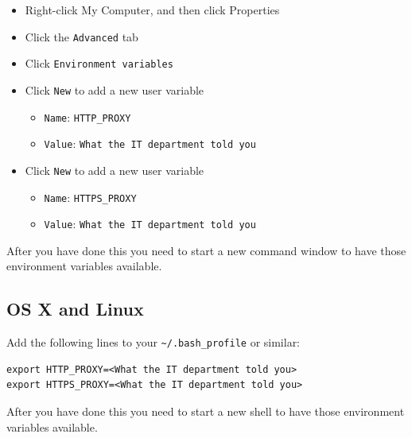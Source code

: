\documentclass[a4paper,12pt]{report}
\begin{document}
\begin{itemize}
    \item Right-click My Computer, and then click Properties
    \item Click the \texttt{Advanced} tab
    \item Click \texttt{Environment variables}
    \item Click \texttt{New} to add a new user variable
    \begin{itemize}
        \item \texttt{Name}: \texttt{HTTP_PROXY}
        \item \texttt{Value}: \texttt{What the IT department told you}
    \end{itemize}
    \item Click \texttt{New} to add a new user variable
    \begin{itemize}
        \item \texttt{Name}: \texttt{HTTPS_PROXY}
        \item \texttt{Value}: \texttt{What the IT department told you}
    \end{itemize}
\end{itemize}

After you have done this you need to start a new command window to have those environment variables available.

\subsection*{OS X and Linux}

Add the following lines to your \texttt{\textasciitilde/.bash_profile} or similar:

\begin{verbatim}
export HTTP_PROXY=<What the IT department told you>
export HTTPS_PROXY=<What the IT department told you>
\end{verbatim}

After you have done this you need to start a new shell to have those environment variables available.
\end{document}

